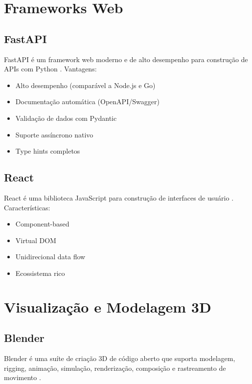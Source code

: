 \section{Frameworks Web}

\subsection{FastAPI}

FastAPI é um framework web moderno e de alto desempenho para construção de APIs com Python \cite{fastapi2021}. Vantagens:

\begin{itemize}
    \item Alto desempenho (comparável a Node.js e Go)
    \item Documentação automática (OpenAPI/Swagger)
    \item Validação de dados com Pydantic
    \item Suporte assíncrono nativo
    \item Type hints completos
\end{itemize}

\subsection{React}

React é uma biblioteca JavaScript para construção de interfaces de usuário \cite{react2021}. Características:

\begin{itemize}
    \item Component-based
    \item Virtual DOM
    \item Unidirecional data flow
    \item Ecossistema rico
\end{itemize}

\section{Visualização e Modelagem 3D}

\subsection{Blender}

Blender é uma suíte de criação 3D de código aberto que suporta modelagem, rigging, animação, simulação, renderização, composição e rastreamento de movimento \cite{blender2021}.

